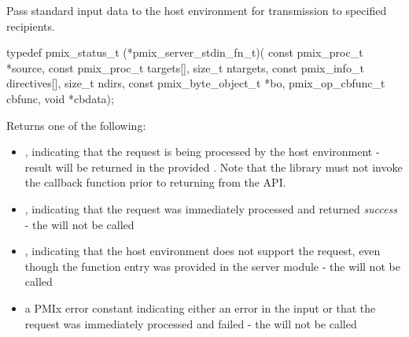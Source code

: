\summary

Pass standard input data to the host environment for transmission to specified recipients.

\format

\cspecificstart
\begin{codepar}
typedef pmix_status_t (*pmix_server_stdin_fn_t)(
                           const pmix_proc_t *source,
                           const pmix_proc_t targets[],
                           size_t ntargets,
                           const pmix_info_t directives[],
                           size_t ndirs,
                           const pmix_byte_object_t *bo,
                           pmix_op_cbfunc_t cbfunc, void *cbdata);
\end{codepar}
\cspecificend

\begin{arglist}
\end{arglist}

Returns one of the following:

\begin{itemize}
    \item {}, indicating that the request is being processed by the host environment - result will be returned in the provided . Note that the library must not invoke the callback function prior to returning from the \ac{API}.
    \item {}, indicating that the request was immediately processed and returned \textit{success} - the  will not be called
    \item {}, indicating that the host environment does not support the request, even though the function entry was provided in the server module - the  will not be called
    \item a PMIx error constant indicating either an error in the input or that the request was immediately processed and failed - the  will not be called
\end{itemize}

